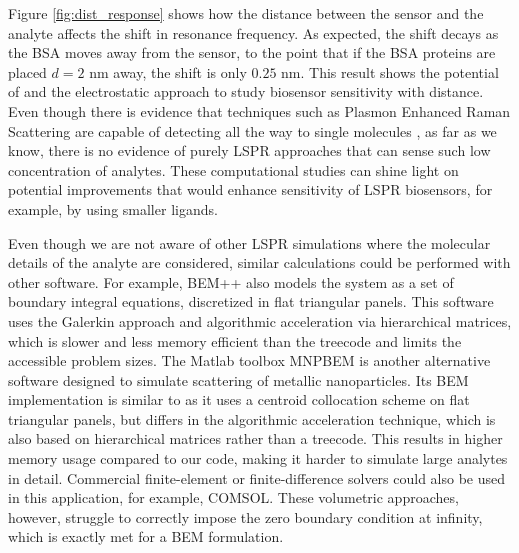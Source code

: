 Figure \ref{fig:dist_response} shows how the distance between the sensor 
and the analyte affects the shift in resonance frequency. As expected, the shift decays 
as the BSA moves away from the sensor, to the point that if the BSA proteins are placed
$d=2$ nm away, the shift is only $0.25$ nm. This result shows the potential of \pygbe 
and the electrostatic approach to study biosensor sensitivity with distance.
Even though there is evidence that techniques such as Plasmon Enhanced Raman Scattering are capable of detecting all the way to single molecules \cite{ZhangZhangETal2013}, 
as far as we know, there is no evidence of purely LSPR approaches that can sense such low concentration of analytes.
These computational studies can shine light on
potential improvements that would enhance sensitivity of LSPR biosensors, for example, by using
smaller ligands. 

Even though we are not aware of other LSPR simulations where the molecular details of the analyte are considered, similar calculations could be performed with other software. 
For example, BEM++ \cite{SmigajETal2015} also models the system as a set of boundary integral equations, discretized in flat triangular panels. 
This software uses the Galerkin approach and algorithmic acceleration via hierarchical matrices, which is slower and less memory efficient than the treecode and limits the accessible problem sizes.
The Matlab toolbox MNPBEM \cite{HohenesterTrugler2012} is another alternative software designed to simulate scattering of metallic nanoparticles.
Its BEM implementation is similar to \pygbe as it uses a centroid collocation scheme on flat triangular panels, but differs in the algorithmic acceleration technique, which is also based on hierarchical matrices rather than a treecode. 
This results in higher memory usage compared to our code, making it harder to simulate large analytes in detail.
Commercial finite-element or finite-difference solvers could also be used in this application, for example, COMSOL. 
These volumetric approaches, however, struggle to correctly impose the zero boundary condition at infinity, which is exactly met for a BEM formulation.
